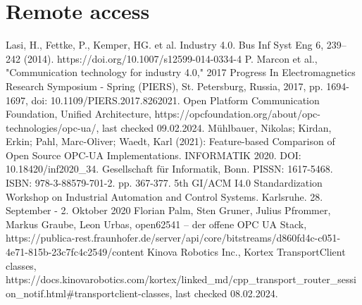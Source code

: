 \documentclass[conference]{IEEEtran}
\begin{document}
\section{Remote access}


\begin{thebibliography}{00}
Lasi, H., Fettke, P., Kemper, HG. et al. Industry 4.0. Bus Inf Syst Eng 6, 239–242 (2014). https://doi.org/10.1007/s12599-014-0334-4
 P. Marcon et al., "Communication technology for industry 4.0," 2017 Progress In Electromagnetics Research Symposium - Spring (PIERS), St. Petersburg, Russia, 2017, pp. 1694-1697, doi: 10.1109/PIERS.2017.8262021.
Open Platform Communication Foundation, Unified Architecture, https://opcfoundation.org/about/opc-technologies/opc-ua/, last checked 09.02.2024.
Mühlbauer, Nikolas; Kirdan, Erkin; Pahl, Marc-Oliver; Waedt, Karl (2021): Feature-based Comparison of Open Source OPC-UA Implementations. INFORMATIK 2020. DOI: 10.18420/inf2020\_34. Gesellschaft für Informatik, Bonn. PISSN: 1617-5468. ISBN: 978-3-88579-701-2. pp. 367-377. 5th GI/ACM I4.0 Standardization Workshop on Industrial Automation and Control Systems. Karlsruhe. 28. September - 2. Oktober 2020
Florian Palm, Sten Gruner, Julius Pfrommer, Markus Graube, Leon Urbas, open62541 – der offene OPC UA Stack, https://publica-rest.fraunhofer.de/server/api/core/bitstreams/d860fd4c-c051-4e71-815b-23c7fc4c2549/content
 Kinova Robotics Inc., Kortex TransportClient classes, https://docs.kinovarobotics.com/kortex/linked\_md/cpp\_transport\_router\_session\_notif.html\#transportclient-classes, last checked 08.02.2024.
\end{thebibliography}
\end{document}

